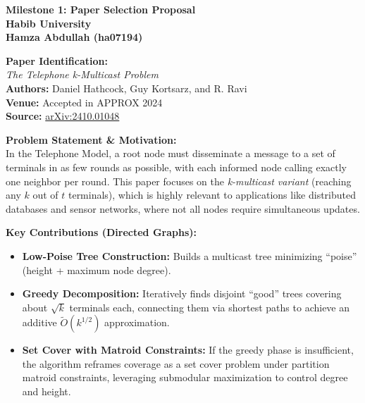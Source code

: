\documentclass[12pt]{article}
\begin{document}
\begin{center}
{\Large \bf Milestone 1: Paper Selection Proposal}\\[0.2cm]
{\bf Habib University}\\[0.4cm]
{\bf Hamza Abdullah (ha07194)}\\
\end{center}

\noindent
\textbf{Paper Identification:}\\
\emph{The Telephone k-Multicast Problem} \\
\textbf{Authors:} Daniel Hathcock, Guy Kortsarz, and R. Ravi \\
\textbf{Venue:} Accepted in APPROX 2024 \\
\textbf{Source:} \href{https://arxiv.org/pdf/2410.01048}{arXiv:2410.01048}

\vspace{0.3cm}

\noindent
\textbf{Problem Statement \& Motivation:}\\
In the Telephone Model, a root node must disseminate a message to a set of terminals in as few rounds as possible, with each informed node calling exactly one neighbor per round. This paper focuses on the \emph{k-multicast variant} (reaching any \(k\) out of \(t\) terminals), which is highly relevant to applications like distributed databases and sensor networks, where not all nodes require simultaneous updates.

\vspace{0.2cm}

\noindent
\textbf{Key Contributions (Directed Graphs):}
\begin{itemize}[leftmargin=0.7cm]
    \item \textbf{Low-Poise Tree Construction:} Builds a multicast tree minimizing ``poise'' (height + maximum node degree).
    \item \textbf{Greedy Decomposition:} Iteratively finds disjoint ``good'' trees covering about \(\sqrt{k}\) terminals each, connecting them via shortest paths to achieve an additive \(\tilde{O}(k^{1/2})\) approximation.
    \item \textbf{Set Cover with Matroid Constraints:} If the greedy phase is insufficient, the algorithm reframes coverage as a set cover problem under partition matroid constraints, leveraging submodular maximization to control degree and height.
\end{itemize}

\vspace{0.2cm}
\end{document}
